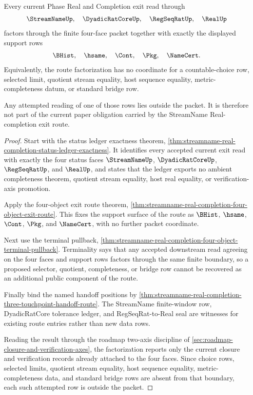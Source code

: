 \begin{theorem}
\label{thm:streamname-real-completion-route-no-choice-factorization}
Every current Phase Real and Completion exit read through
$$
\StreamNameUp,\quad \DyadicRatCoreUp,\quad \RegSeqRatUp,\quad \RealUp
$$
factors through the finite four-face packet together with exactly the displayed support rows
$$
\BHist,\quad \hsame,\quad \Cont,\quad \Pkg,\quad \NameCert.
$$
Equivalently, the route factorization has no coordinate for a countable-choice row, selected limit, quotient stream equality, host sequence equality, metric-completeness datum, or standard bridge row.

Any attempted reading of one of those rows lies outside the packet. It is therefore not part of the current paper obligation carried by the StreamName Real-completion exit route.
\end{theorem}
\begin{proof}
Start with the status ledger exactness theorem, \autoref{thm:streamname-real-completion-status-ledger-exactness}. It identifies every accepted current exit read with exactly the four status faces $\StreamNameUp$, $\DyadicRatCoreUp$, $\RegSeqRatUp$, and $\RealUp$, and states that the ledger exports no ambient completeness theorem, quotient stream equality, host real equality, or verification-axis promotion.

Apply the four-object exit route theorem, \autoref{thm:streamname-real-completion-four-object-exit-route}. This fixes the support surface of the route as $\BHist$, $\hsame$, $\Cont$, $\Pkg$, and $\NameCert$, with no further packet coordinate.

Next use the terminal pullback, \autoref{thm:streamname-real-completion-four-object-terminal-pullback}. Terminality says that any accepted downstream read agreeing on the four faces and support rows factors through the same finite boundary, so a proposed selector, quotient, completeness, or bridge row cannot be recovered as an additional public component of the route.

Finally bind the named handoff positions by \autoref{thm:streamname-real-completion-three-touchpoint-handoff-route}. The StreamName finite-window row, DyadicRatCore tolerance ledger, and RegSeqRat-to-Real seal are witnesses for existing route entries rather than new data rows.

Reading the result through the roadmap two-axis discipline of \autoref{sec:roadmap-closure-and-verification-axes}, the factorization reports only the current closure and verification records already attached to the four faces. Since choice rows, selected limits, quotient stream equality, host sequence equality, metric-completeness data, and standard bridge rows are absent from that boundary, each such attempted row is outside the packet.
\end{proof}

